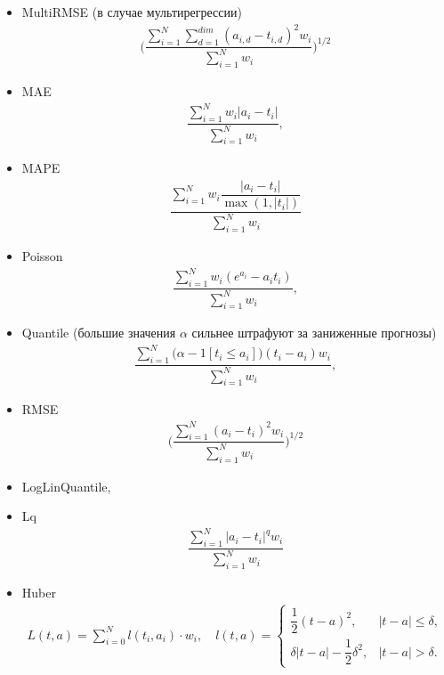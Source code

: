\documentclass[%
	11pt,
	a4paper,
	utf8,
		]{article}
\begin{document}
\begin{itemize}
	\item MultiRMSE (в случае мультирегрессии)
\begin{align*}
	\Biggl( \dfrac{ \sum\limits_{i=1}^N \sum\limits_{d=1}^{dim} (a_{i,d} - t_{i,d})^2 w_i }{ \sum\limits_{i=1}^N w_i } \Biggr)^{1/2}
\end{align*}
	
	\item MAE
\begin{align*}
	\dfrac{ \sum\limits_{i=1}^{N} w_i | a_i - t_i |}{ \sum\limits_{i=1}^{N} w_i },
\end{align*}

    \item MAPE
\begin{align*}
	\dfrac{ \sum\limits_{i=1}^{N} w_i \dfrac{ | a_i - t_i | }{ \max (1, | t_i |) } }{ \sum\limits_{i=1}^N w_i }
\end{align*}

    \item Poisson
\begin{align*}
	\dfrac{ \sum\limits_{i=1}^N w_i (e^{ a_i } - a_i t_i) }{ \sum\limits_{i=1}^N w_i },
\end{align*}

   \item Quantile (большие значения $ \alpha $ сильнее штрафуют за заниженные прогнозы)
\begin{align*}
	\dfrac{ \sum\limits_{i=1}^N \Big( \alpha - 1[t_i \leqslant a_i] \Big) (t_i - a_i) w_i}{ \sum\limits_{i=1}^N w_i },
\end{align*}

    \item RMSE
\begin{align*}
	\Bigg( \dfrac{ \sum\limits_{i=1}^N (a_i - t_i)^2 w_i }{ \sum\limits_{i=1}^N w_i } \Bigg)^{1/2}
\end{align*}

    \item LogLinQuantile,
    
    \item Lq
\begin{align*}
	\dfrac{\sum\limits_{i=1}^N | a_i - t_i |^q w_i}{ \sum\limits_{i=1}^N w_i }
\end{align*}

    \item Huber
\begin{align*}
	L(t, a) = \sum_{i=0}^N l(t_i, a_i) \cdot w_i,\quad l(t, a) = 
	\begin{cases}
		\dfrac{1}{2} (t - a)^2, &| t - a | \leqslant \delta,\\
		\delta | t - a | - \dfrac{1}{2} \delta^2, &| t - a | > \delta.
	\end{cases}
\end{align*}


\end{itemize}
\end{document}
